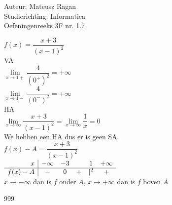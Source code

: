 \documentclass[a4paper]{article}
\begin{document}
\noindent \large Auteur: Mateusz Ragan \\
\noindent \large Studierichting: Informatica\\
\noindent \large Oefeningenreeks 3F nr. 1.7\\

\medskip

\normalsize

$f(x) = \dfrac{x+3}{(x-1)^2}$\\

VA\\

$\lim\limits_{x \rightarrow 1+} \dfrac{4}{(0^+)^2} = +\infty$\\

$\lim\limits_{x \rightarrow1-} \dfrac{4}{(0^-)^2} = +\infty$\\

HA\\

$\lim\limits_{x \rightarrow\infty} \dfrac{x+3}{(x-1)^2} = \lim\limits_{x \rightarrow\infty} \dfrac{1}{x} = 0$\\

We hebben een HA dus er is geen SA.\\

$f(x)-A= \dfrac{x+3}{(x-1)^2}$\\

$\begin{array}{r|c c c c c c}
x 		 & -\infty & -3 & & 1 & +\infty \\ \hline
f(x)-A & - & 0 & + & |^2 & + \\
\end{array}$\\

$x\rightarrow -\infty$ dan is $f$ onder $A$, $x\rightarrow +\infty$ dan is $f$ boven $A$ 





\begin{thebibliography}{999}
\end{thebibliography}
\end{document}
